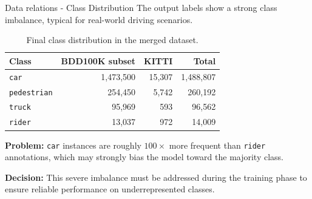 \documentclass{beamer}
\begin{document}
\begin{frame}{Data relations - Class Distribution}
    The output labels show a strong class imbalance, typical for real-world driving scenarios.
    
    \vspace{0.3cm}
    \begin{table}
        \centering
        \footnotesize
        \begin{tabular}{lrrr}
        \toprule
        \textbf{Class} & \textbf{BDD100K subset} & \textbf{KITTI} & \textbf{Total} \\
        \midrule
        \texttt{car}        & 1,473,500 & 15,307 & 1,488,807 \\
        \texttt{pedestrian} & 254,450   & 5,742  & 260,192 \\
        \texttt{truck}      & 95,969    & 593    & 96,562 \\
        \texttt{rider}      & 13,037    & 972    & 14,009 \\
        \bottomrule
        \end{tabular}
        \caption{Final class distribution in the merged dataset.}
    \end{table}
    \vspace{0.2cm}
    \textbf{Problem:} \texttt{car} instances are roughly $100\times$ more frequent than \texttt{rider} annotations, which may strongly bias the model toward the majority class.
    
    \vspace{0.2cm}
    \textbf{Decision:} This severe imbalance must be addressed during the training phase to ensure reliable performance on underrepresented classes.
\end{frame}
\end{document}
